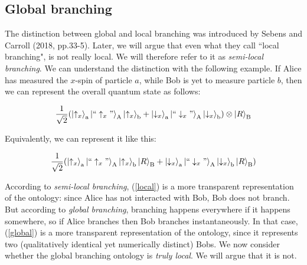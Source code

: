 \documentclass[a4paper]{article}
\begin{document}
\subsection{Global branching}\label{Global branching}

The distinction between global and local branching was introduced by Sebens and Carroll (2018, pp.33-5). Later, we will argue that even what they call ``local branching", is not really local. We will therefore refer to it as \textit{semi-local branching}. We can understand the distinction with the following example. If Alice has measured the $x$-spin of particle $a$, while Bob is yet to measure particle $b$, then we can represent the overall quantum state as follows:

\begin{equation}\label{local}
\frac{1}{\sqrt 2}(\Ket{\uparrow_x}_{\rm a}\Ket{``\uparrow_x"}_{\rm A}\Ket{\uparrow_x}_{\rm b}+
\Ket{\downarrow_x}_{\rm a}\Ket{``\downarrow_x"}_{\rm A}\Ket{\downarrow_x}_{\rm b}) \otimes \Ket{R}_{\rm B}
\end{equation}

Equivalently, we can represent it like this:

\begin{equation}\label{global}
\frac{1}{\sqrt 2}(\Ket{\uparrow_x}_{\rm a}\Ket{``\uparrow_x"}_{\rm A}\Ket{\uparrow_x}_{\rm b}\Ket{R}_{\rm B}+
\Ket{\downarrow_x}_{\rm a}\Ket{``\downarrow_x"}_{\rm A}\Ket{\downarrow_x}_{\rm b}\Ket{R}_{\rm B})
\end{equation}

According to \textit{semi-local branching}, (\ref{local}) is a more transparent representation of the ontology: since Alice has not interacted with Bob, Bob does not branch. But according to \textit{global branching}, branching happens everywhere if it happens somewhere, so if Alice branches then Bob branches instantaneously. In that case, (\ref{global}) is a more transparent representation of the ontology, since it represents two (qualitatively identical yet numerically distinct) Bobs. We now consider whether the global branching ontology is \textit{truly local}. We will argue that it is not. 
\end{document}
